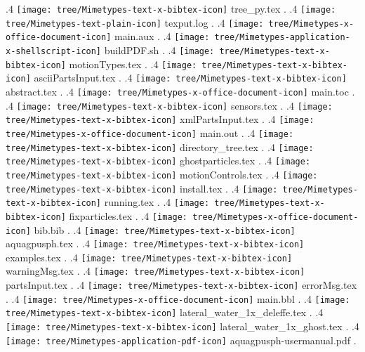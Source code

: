{.4 { \texttt{[image: tree/Mimetypes-text-x-bibtex-icon]} tree\_py.tex }.
.4 { \texttt{[image: tree/Mimetypes-text-plain-icon]} texput.log }.
.4 { \texttt{[image: tree/Mimetypes-x-office-document-icon]} main.aux }.
.4 { \texttt{[image: tree/Mimetypes-application-x-shellscript-icon]} buildPDF.sh }.
.4 { \texttt{[image: tree/Mimetypes-text-x-bibtex-icon]} motionTypes.tex }.
.4 { \texttt{[image: tree/Mimetypes-text-x-bibtex-icon]} asciiPartsInput.tex }.
.4 { \texttt{[image: tree/Mimetypes-text-x-bibtex-icon]} abstract.tex }.
.4 { \texttt{[image: tree/Mimetypes-x-office-document-icon]} main.toc }.
.4 { \texttt{[image: tree/Mimetypes-text-x-bibtex-icon]} sensors.tex }.
.4 { \texttt{[image: tree/Mimetypes-text-x-bibtex-icon]} xmlPartsInput.tex }.
.4 { \texttt{[image: tree/Mimetypes-x-office-document-icon]} main.out }.
.4 { \texttt{[image: tree/Mimetypes-text-x-bibtex-icon]} directory\_tree.tex }.
.4 { \texttt{[image: tree/Mimetypes-text-x-bibtex-icon]} ghostparticles.tex }.
.4 { \texttt{[image: tree/Mimetypes-text-x-bibtex-icon]} motionControls.tex }.
.4 { \texttt{[image: tree/Mimetypes-text-x-bibtex-icon]} install.tex }.
.4 { \texttt{[image: tree/Mimetypes-text-x-bibtex-icon]} running.tex }.
.4 { \texttt{[image: tree/Mimetypes-text-x-bibtex-icon]} fixparticles.tex }.
.4 { \texttt{[image: tree/Mimetypes-x-office-document-icon]} bib.bib }.
.4 { \texttt{[image: tree/Mimetypes-text-x-bibtex-icon]} aquagpusph.tex }.
.4 { \texttt{[image: tree/Mimetypes-text-x-bibtex-icon]} examples.tex }.
.4 { \texttt{[image: tree/Mimetypes-text-x-bibtex-icon]} warningMsg.tex }.
.4 { \texttt{[image: tree/Mimetypes-text-x-bibtex-icon]} partsInput.tex }.
.4 { \texttt{[image: tree/Mimetypes-text-x-bibtex-icon]} errorMsg.tex }.
.4 { \texttt{[image: tree/Mimetypes-x-office-document-icon]} main.bbl }.
.4 { \texttt{[image: tree/Mimetypes-text-x-bibtex-icon]} lateral\_water\_1x\_deleffe.tex }.
.4 { \texttt{[image: tree/Mimetypes-text-x-bibtex-icon]} lateral\_water\_1x\_ghost.tex }.
.4 { \texttt{[image: tree/Mimetypes-application-pdf-icon]} aquagpusph-usermanual.pdf }.
}
